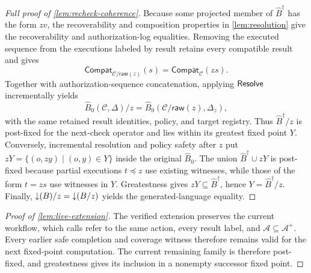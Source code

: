 \begin{proof}[Full proof of \cref{lem:recheck-coherence}]
Because some projected member of \(\widehat B^\dagger\) has the form \(zv\), the recoverability and composition properties in \cref{lem:resolution} give the recoverability and authorization-log equalities.
Removing the executed sequence from the executions labeled by result retains every compatible result and gives
\[
 \mathsf{Compat}_{\mathcal C/\mathsf{raw}(z)}(s)
 =\mathsf{Compat}_{\mathcal C}(zs).
\]
Together with authorization-sequence concatenation, applying \(\mathsf{Resolve}\) incrementally yields
\[
 \widehat B_0(\mathcal C,\Delta)/z
 =\widehat B_0(\mathcal C/\mathsf{raw}(z),\Delta_z),
\]
with the same retained result identities, policy, and target registry.
Thus \(\widehat B^\dagger/z\) is post-fixed for the next-check operator and lies within its greatest fixed point \(Y\).
Conversely, incremental resolution and policy safety after \(z\) put \(zY=\{(o,zy)\mid(o,y)\in Y\}\) inside the original \(\widehat B_0\).
The union \(\widehat B^\dagger\cup zY\) is post-fixed because partial executions \(t\preceq z\) use existing witnesses, while those of the form \(t=zs\) use witnesses in \(Y\).
Greatestness gives \(zY\subseteq\widehat B^\dagger\), hence \(Y=\widehat B^\dagger/z\).
Finally, \(\mathord{\downarrow}(B)/z=\mathord{\downarrow}(B/z)\) yields the generated-language equality.
\end{proof}

\begin{proof}[Proof of \cref{lem:live-extension}]
\label{app:live-extension-proof}
The verified extension preserves the current workflow, which calls refer to the same action, every result label, and \(\mathcal A\subseteq\mathcal A^+\).
Every earlier safe completion and coverage witness therefore remains valid for the next fixed-point computation.
The current remaining family is therefore post-fixed, and greatestness gives its inclusion in a nonempty successor fixed point.
\end{proof}

